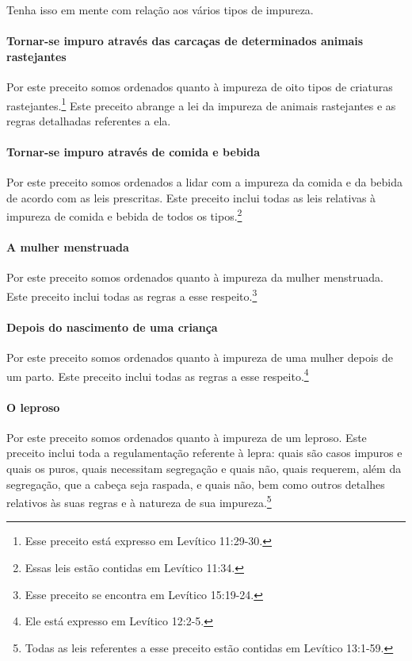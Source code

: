 Tenha isso em mente com relação aos vários tipos de impureza.

\paragraph{Tornar-se impuro através das carcaças de determinados animais rastejantes}

Por este preceito somos ordenados quanto à impureza de oito tipos
de criaturas rastejantes.\footnote{Esse preceito está expresso em Levítico 11:29-30.} Este preceito abrange a
lei da impureza de animais rastejantes e as regras detalhadas referentes
a ela.

\paragraph{Tornar-se impuro através de comida e bebida}

Por este preceito somos ordenados a lidar com a impureza da comida e da
bebida de acordo com as leis prescritas. Este preceito inclui todas as
leis relativas à impureza de comida e bebida de todos os
tipos.\footnote{Essas leis estão contidas em Levítico 11:34.}

\paragraph{A mulher menstruada}

Por este preceito somos ordenados quanto à impureza da mulher
menstruada. Este preceito inclui todas as regras a esse
respeito.\footnote{Esse preceito se encontra em Levítico 15:19-24.}

\paragraph{Depois do nascimento de uma criança}

Por este preceito somos ordenados quanto à impureza de uma mulher
depois de um parto. Este preceito inclui todas as regras a esse
respeito.\footnote{Ele está expresso em Levítico 12:2-5.}

\paragraph{O leproso}

Por este preceito somos ordenados quanto à impureza de um leproso. Este
preceito inclui toda a regulamentação referente à lepra: quais são casos
impuros e quais os puros, quais necessitam segregação e quais não, quais
requerem, além da segregação, que a cabeça seja raspada, e quais não,
bem como outros detalhes relativos às suas regras e à natureza de sua
impureza.\footnote{Todas as leis referentes a esse preceito estão contidas em Levítico
  13:1-59.}



